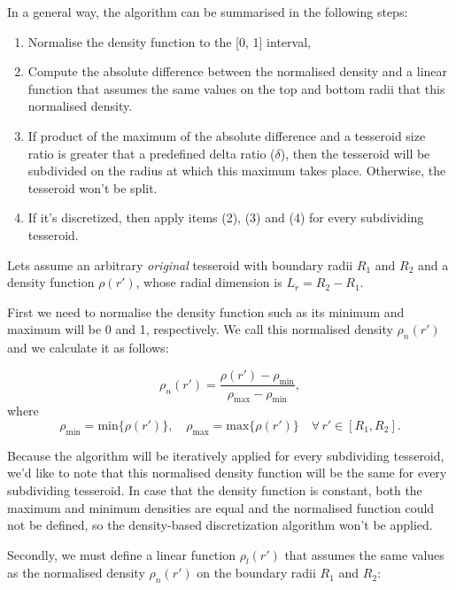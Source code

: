 \documentclass[extra]{gji}
\begin{document}
In a general way, the algorithm can be summarised in the following steps:

\begin{enumerate}
\renewcommand{\theenumi}{(\arabic{enumi})}
    \item Normalise the density function to the [0, 1] interval,
    \item Compute the absolute difference between the normalised 
          density and a linear function that assumes the same values on the 
          top and bottom radii that this normalised density.
    \item If product of the maximum of the absolute difference and a 
          tesseroid size ratio is greater that a predefined delta ratio 
          ($\delta$), then the tesseroid will be subdivided on the 
          radius at which this maximum takes place. Otherwise, the 
          tesseroid won't be split.
    \item If it's discretized, then apply items (2), (3) and (4) for 
          every subdividing tesseroid.
\end{enumerate}

Lets assume an arbitrary \emph{original} tesseroid with boundary radii 
$R_1$ and $R_2$ and a density function $\rho(r')$, whose radial 
dimension is $L_r = R_2 - R_1$.

First we need to normalise the density function such as its minimum and 
maximum will be 0 and 1, respectively.
We call this normalised density $\rho_n(r')$ and we calculate it as 
follows:

\begin{equation}
    \rho_n(r') =
    \frac{\rho(r') - \rho_\text{min}}{\rho_\text{max} - \rho_\text{min}},
\end{equation}
\noindent where
\begin{equation}
    \rho_\text{min} = \text{min}\{ \rho(r') \}, \quad
    \rho_\text{max} = \text{max}\{ \rho(r') \} \quad
    \forall \, r' \in [R_1, R_2].
\end{equation}

\noindent Because the algorithm will be iteratively applied for every 
subdividing tesseroid, we'd like to note that this normalised density 
function will be the same for every subdividing tesseroid.
In case that the density function is constant, both the maximum and 
minimum densities are equal and the normalised function could not 
be defined, so the density-based discretization algorithm won't be 
applied.

Secondly, we must define a linear function $\rho_l(r')$ that assumes 
the same values as the normalised density $\rho_n(r')$ on the boundary 
radii $R_1$ and $R_2$:
\end{document}
